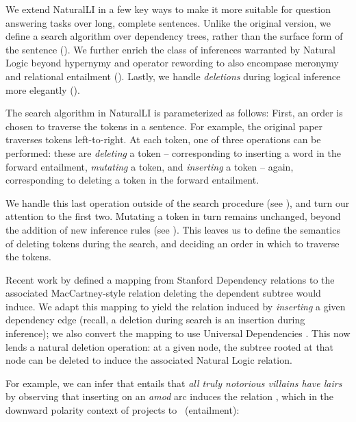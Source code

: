 We extend NaturalLI in a few key ways to make it more suitable for question
  answering tasks over long, complete sentences.
Unlike the original version, we define a search algorithm over dependency
  trees, rather than the surface form of the sentence ().
We further enrich the class of inferences warranted by Natural Logic beyond
  hypernymy and operator rewording to also encompase meronymy and
  relational entailment ().
Lastly, we handle \textit{deletions} during logical inference more elegantly
  ().

%
%
The search algorithm in NaturalLI is parameterized as follows:
First, an order is chosen to traverse the tokens in a sentence.
For example, the original paper traverses tokens left-to-right.
At each token, one of three operations can be performed:
  these are \textit{deleting} a token
  -- corresponding to inserting a word in the forward entailment,
  \textit{mutating} a token, and \textit{inserting} a token -- again, corresponding
  to deleting a token in the forward entailment.

We handle this last operation outside of the search procedure (see ),
  and turn our attention to the first two.
Mutating a token in turn remains unchanged, beyond the addition of new inference rules
  (see ).
This leaves us to define the semantics of deleting tokens during the search, and
  deciding an order in which to traverse the tokens.

Recent work by  defined a mapping from Stanford
  Dependency relations to the associated MacCartney-style relation deleting the
  dependent subtree would induce.
We adapt this mapping to yield the relation induced by \textit{inserting} a
  given dependency edge (recall, a deletion during search is an insertion during
  inference); we also convert the mapping to use Universal Dependencies
  \cite{key:stanford-ud}.
This now lends a natural deletion operation: at a given node, the subtree rooted
  at that node can be deleted to induce the associated Natural Logic relation.

For example, we can infer that  entails that
  \textit{all truly notorious villains have lairs} by observing that inserting
  on an \textit{amod} arc induces the relation \reverse, which in the downward
  polarity context of \textit{} projects to \forward\ (entailment):

